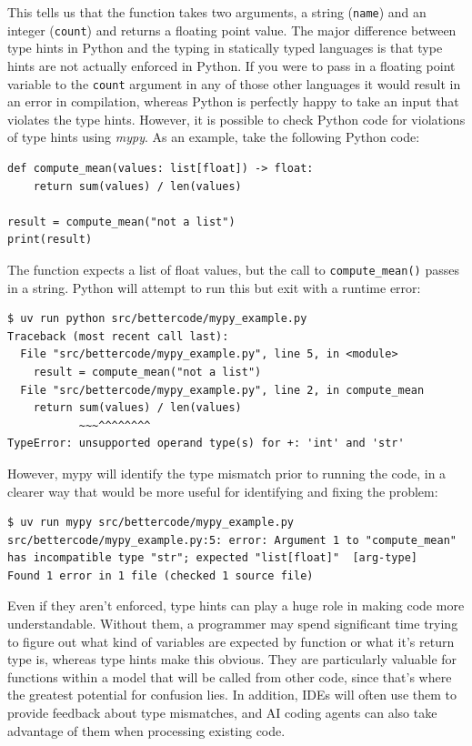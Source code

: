 This tells us that the function takes two arguments, a string (\texttt{name}) and an integer (\texttt{count}) and returns a floating point value.  The major difference between type hints in Python and the typing in statically typed languages is that type hints are not actually enforced in Python. If you were to pass in a floating point variable to the \texttt{count} argument in any of those other languages it would result in an error in compilation, whereas Python is perfectly happy to take an input that violates the type hints.  However, it is possible to check Python code for violations of type hints using \textit{mypy}. As an example, take the following Python code:

\begin{lstlisting}[style=Python]
def compute_mean(values: list[float]) -> float:
    return sum(values) / len(values)

result = compute_mean("not a list")
print(result)
\end{lstlisting}

The function expects a list of float values, but the call to \texttt{compute\_mean()} passes in a string.  Python will attempt to run this but exit with a runtime error:

\begin{lstlisting}[style=shell]
$ uv run python src/bettercode/mypy_example.py
Traceback (most recent call last):
  File "src/bettercode/mypy_example.py", line 5, in <module>
    result = compute_mean("not a list")
  File "src/bettercode/mypy_example.py", line 2, in compute_mean
    return sum(values) / len(values)
           ~~~^^^^^^^^
TypeError: unsupported operand type(s) for +: 'int' and 'str'
\end{lstlisting}

However, mypy will identify the type mismatch prior to running the code, in a clearer way that would be more useful for identifying and fixing the problem:

\begin{lstlisting}[style=shellshort]
$ uv run mypy src/bettercode/mypy_example.py
src/bettercode/mypy_example.py:5: error: Argument 1 to "compute_mean" has incompatible type "str"; expected "list[float]"  [arg-type]
Found 1 error in 1 file (checked 1 source file)
\end{lstlisting}

Even if they aren't enforced, type hints can play a huge role in making code more understandable.  Without them, a programmer may spend significant time trying to figure out what kind of variables are expected by function or what it's return type is, whereas type hints make this obvious.  They are particularly valuable for functions within a model that will be called from other code, since that's where the greatest potential for confusion lies.  In addition, IDEs will often use them to provide feedback about type mismatches, and AI coding agents can also take advantage of them when processing existing code.

